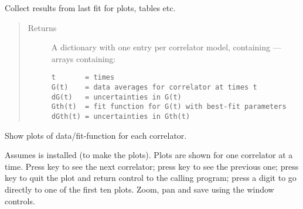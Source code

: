 \documentclass[letterpaper,10pt,english]{sphinxmanual}
\begin{document}
\begin{fulllineitems}
\begin{fulllineitems}
\end{fulllineitems}


\begin{fulllineitems}
\label{corrfitter:corrfitter.CorrFitter.collect_fitresults}
Collect results from last fit for plots, tables etc.
\begin{quote}\begin{description}
\item[{Returns}] \leavevmode

A dictionary with one entry per correlator model,
containing  --- arrays containing:

\begin{Verbatim}[commandchars=\\\{\}]
t       = times
G(t)    = data averages for correlator at times t
dG(t)   = uncertainties in G(t)
Gth(t)  = fit function for G(t) with best-fit parameters
dGth(t) = uncertainties in Gth(t)
\end{Verbatim}


\end{description}\end{quote}

\end{fulllineitems}


\begin{fulllineitems}
\label{corrfitter:corrfitter.CorrFitter.display_plots}
Show plots of data/fit-function for each correlator.

Assumes  is installed (to make the plots). Plots
are shown for one correlator at a time. Press key  to see the
next correlator; press key  to see the previous one; press key
 to quit the plot and return control to the calling program;
press a digit to go directly to one of the first ten plots. Zoom,
pan and save using the window controls.

\end{fulllineitems}



\end{fulllineitems}
\end{document}
